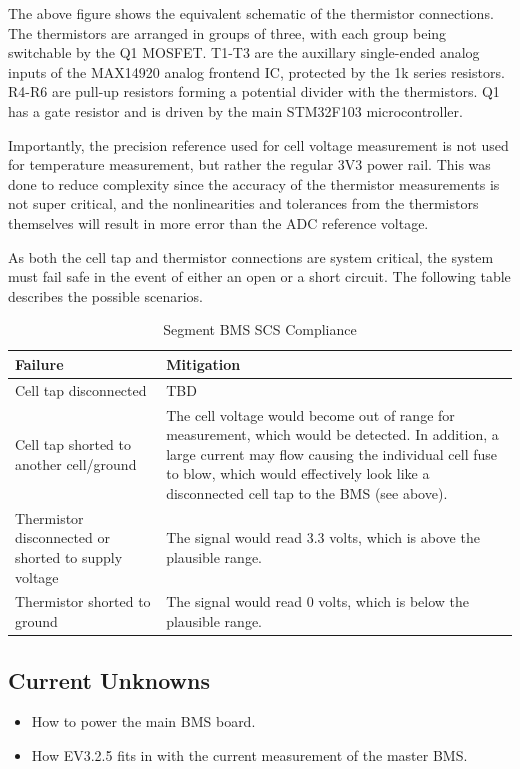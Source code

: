 \documentclass[12pt, a4paper]{article}
\begin{document}
The above figure shows the equivalent schematic of the thermistor connections.
The thermistors are arranged in groups of three, with each group being switchable by the Q1 MOSFET.
T1-T3 are the auxillary single-ended analog inputs of the MAX14920 analog frontend IC, protected by the 1k series resistors.
R4-R6 are pull-up resistors forming a potential divider with the thermistors.
Q1 has a gate resistor and is driven by the main STM32F103 microcontroller.

Importantly, the precision reference used for cell voltage measurement is not used for temperature measurement, but rather the regular 3V3 power rail.
This was done to reduce complexity since the accuracy of the thermistor measurements is not super critical, and the nonlinearities and tolerances from the thermistors themselves will result in more error than the ADC reference voltage.

As both the cell tap and thermistor connections are system critical, the system must fail safe in the event of either an open or a short circuit.
The following table describes the possible scenarios.

\begin{table}[H]
  \centering
  \begin{tabular}{|p{0.3\linewidth}|p{0.7\linewidth}|}
    \hline
    \textbf{Failure} & \textbf{Mitigation} \\
    \hline
    Cell tap disconnected & TBD \\
    \hline
    Cell tap shorted to another cell/ground & The cell voltage would become out of range for measurement, which would be detected.
                                              In addition, a large current may flow causing the individual cell fuse to blow, which would effectively look like a disconnected cell tap to the BMS (see above). \\
    \hline
    Thermistor disconnected or shorted to supply voltage & The signal would read 3.3 volts, which is above the plausible range. \\
    \hline
    Thermistor shorted to ground & The signal would read 0 volts, which is below the plausible range. \\
    \hline
  \end{tabular}
  \caption{Segment BMS SCS Compliance}
  \label{tbl:segment-bms-scs-compliance}
\end{table}

\subsection{Current Unknowns}
\begin{itemize}
\item How to power the main BMS board.
\item How EV3.2.5 fits in with the current measurement of the master BMS.
\end{itemize}

\begin{versionhistory}
\end{versionhistory}
\end{document}

